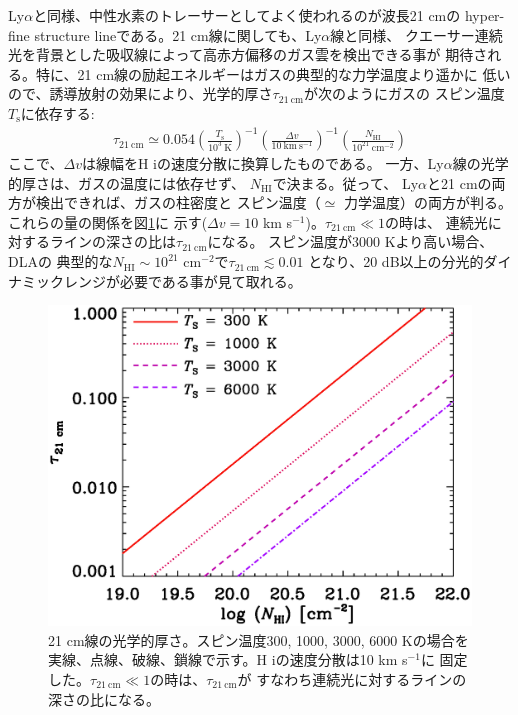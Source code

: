 Ly$\alpha$と同様、中性水素のトレーサーとしてよく使われるのが波長21 cmの
hyper-fine structure lineである。21 cm線に関しても、Ly$\alpha$線と同様、
クエーサー連続光を背景とした吸収線によって高赤方偏移のガス雲を検出できる事が
期待される。特に、21 cm線の励起エネルギーはガスの典型的な力学温度より遥かに
低いので、誘導放射の効果により、光学的厚さ$\tau_\mathrm{21~cm}$が次のようにガスの
スピン温度$T_\mathrm{s}$に依存する\citep{2006PhR...433..181F}:
\begin{eqnarray}
\tau_\mathrm{21~cm}\simeq
0.054
\left(\frac{T_\mathrm{s}}{10^3~\mathrm{K}}\right)^{-1}
\left(\frac{\Delta v}{10~\mathrm{km~s^{-1}}}\right)^{-1}
\left(\frac{N_\mathrm{HI}}{10^{21}~\mathrm{cm^{-2}} }\right)
\label{eq:tau21cm}
\end{eqnarray}
ここで、$\Delta v$は線幅をH {\sc i}の速度分散に換算したものである。
一方、Ly$\alpha$線の光学的厚さは、ガスの温度には依存せず、
$N_\mathrm{HI}$で決まる。従って、
Ly$\alpha$と21 cmの両方が検出できれば、ガスの柱密度と
スピン温度（$\simeq$ 力学温度）の両方が判る。
これらの量の関係を図\ref{fig:tau21cm}に
示す($\Delta v=10$ km s$^{-1}$)。$\tau_\mathrm{21~cm}\ll 1$の時は、
連続光に対するラインの深さの比は$\tau_\mathrm{21~cm}$になる\citep{rybicki79}。
スピン温度が3000 Kより高い場合、DLAの
典型的な$N_\mathrm{HI}\sim 10^{21}$ cm$^{-2}$で$\tau_\mathrm{21~cm}\lesssim 0.01$
となり、20 dB以上の分光的ダイナミックレンジが必要である事が見て取れる。

\begin{figure}[tbp]
\begin{center}
\includegraphics[width=0.7\linewidth]{galaxy/tau21cm.eps}
\end{center}
\vspace{-0.5cm}
\caption{21 cm線の光学的厚さ。スピン温度300, 1000, 3000, 6000 Kの場合を
実線、点線、破線、鎖線で示す。H {\sc i}の速度分散は10 km s$^{-1}$に
固定した。$\tau_\mathrm{21~cm}\ll 1$の時は、$\tau_\mathrm{21~cm}$が
すなわち連続光に対するラインの深さの比になる。}
\label{fig:tau21cm}
\end{figure}

